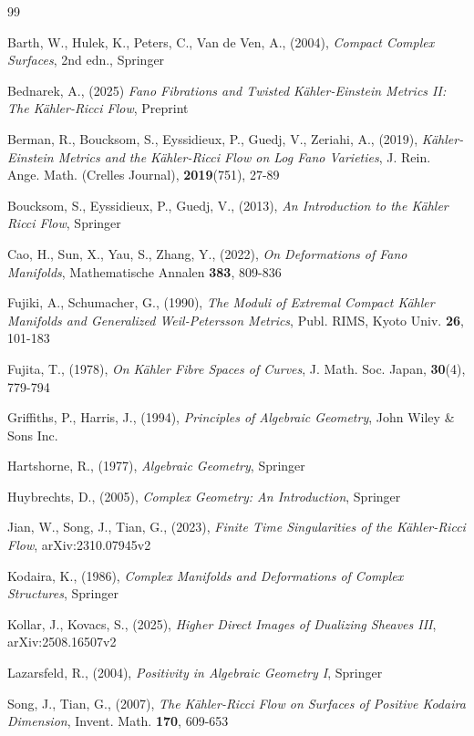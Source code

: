 \documentclass[12pt]{article}
\numberwithin{equation}{section}
\begin{document}
\begin{thebibliography}{99}

 Barth, W., Hulek, K., Peters, C., Van de Ven, A., (2004),
\textit{Compact Complex Surfaces},
2nd edn., Springer

 Bednarek, A., (2025) 
\textit{Fano Fibrations and Twisted K\"ahler-Einstein Metrics II: The K\"ahler-Ricci Flow}, 
Preprint

 Berman, R., Boucksom, S., Eyssidieux, P., Guedj, V., Zeriahi, A., (2019), 
\textit{K\"ahler-Einstein Metrics and the K\"ahler-Ricci Flow on Log Fano Varieties},
J. Rein. Ange. Math. (Crelles Journal), \textbf{2019}(751), 27-89   

 Boucksom, S., Eyssidieux, P., Guedj, V., (2013), 
\textit{An Introduction to the K\"ahler Ricci Flow}, 
Springer

 Cao, H., Sun, X., Yau, S., Zhang, Y., (2022),
\textit{On Deformations of Fano Manifolds},
Mathematische Annalen \textbf{383}, 809-836

 Fujiki, A., Schumacher, G., (1990),
\textit{The Moduli of Extremal Compact K\"ahler Manifolds and Generalized Weil-Petersson Metrics}, 
Publ. RIMS, Kyoto Univ. \textbf{26}, 101-183

 Fujita, T., (1978), 
\textit{On K\"ahler Fibre Spaces of Curves},
J. Math. Soc. Japan,  \textbf{30}(4), 779-794 

 Griffiths, P., Harris, J., (1994), 
\textit{Principles of Algebraic Geometry}, 
John Wiley \& Sons Inc.

 Hartshorne, R., (1977), 
\textit{Algebraic Geometry}, 
Springer

 Huybrechts, D., (2005), 
\textit{Complex Geometry: An Introduction}, 
Springer

 Jian, W., Song, J., Tian, G., (2023), 
\textit{Finite Time Singularities of the K\"ahler-Ricci Flow}, arXiv:2310.07945v2

 Kodaira, K., (1986), 
\textit{Complex Manifolds and Deformations of Complex Structures},
Springer

 Kollar, J., Kovacs, S., (2025), 
\textit{Higher Direct Images of Dualizing Sheaves III},
arXiv:2508.16507v2

 Lazarsfeld, R., (2004), 
\textit{Positivity in Algebraic Geometry I}, 
Springer

 Song, J., Tian, G., (2007), 
\textit{The K\"ahler-Ricci Flow on Surfaces of Positive Kodaira Dimension}, 
Invent. Math. \textbf{170}, 609-653


\end{thebibliography}
\end{document}
